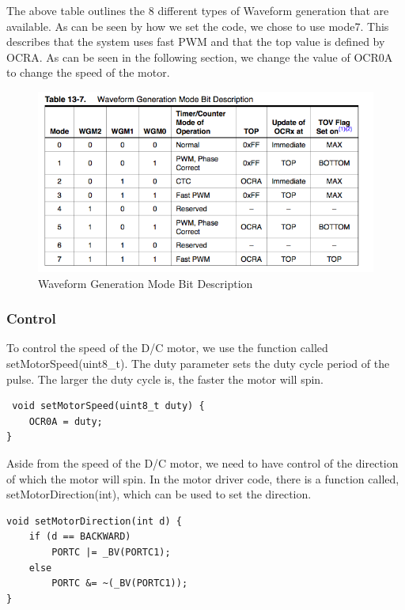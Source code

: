 The above table outlines the 8 different types of  Waveform generation that are available. As can be seen by how we set the code, we chose to use mode7. This describes that the system uses fast PWM and that the top value is defined by OCRA.  As can be seen in the following section, we change the value of OCR0A to  change the speed of the motor.

\begin{figure}[ht]
  \begin{center}
    \includegraphics[width=125mm]{imageSources/waveformGenerationTable.png}
  \end{center}
  \caption{Waveform Generation Mode Bit Description} 
  \label{waveformGenerationTable}
\end{figure}

\subsubsection{Control}
To control the speed of the D/C motor, we use the function called setMotorSpeed(uint8\_t). The duty parameter sets the duty cycle period of the pulse. The larger the duty cycle is, the faster the motor will spin. 

\begin{lstlisting}
 void setMotorSpeed(uint8_t duty) {
	OCR0A = duty;
}
\end{lstlisting}

Aside from the speed of the D/C motor, we need to have control of the direction of which the motor will spin. In the motor driver code, there is a function called, setMotorDirection(int), which can be used to set the direction. 

\begin{lstlisting}
void setMotorDirection(int d) {
    if (d == BACKWARD)
        PORTC |= _BV(PORTC1);
    else
        PORTC &= ~(_BV(PORTC1));
}
\end{lstlisting}

